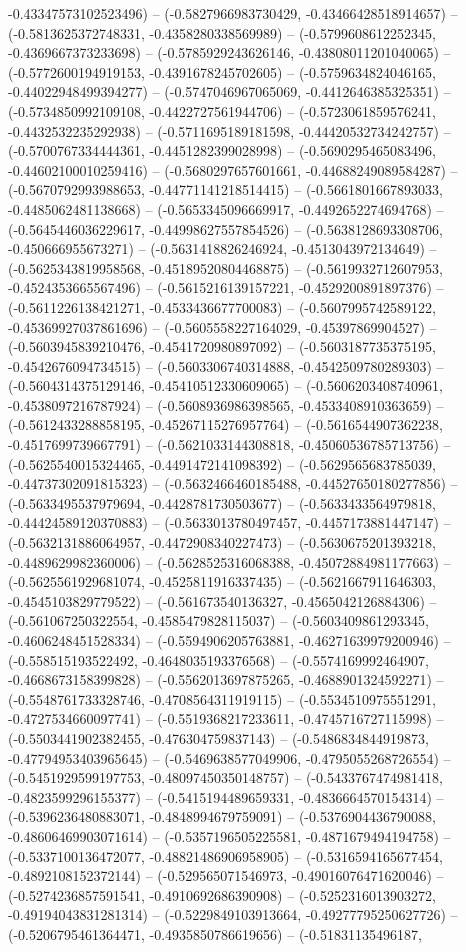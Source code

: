 -0.43347573102523496) -- (-0.5827966983730429, -0.43466428518914657) -- (-0.5813625372748331, -0.4358280338569989) -- (-0.5799608612252345, -0.4369667373233698) -- (-0.5785929243626146, -0.43808011201040065) -- (-0.5772600194919153, -0.4391678245702605) -- (-0.5759634824046165, -0.44022948499394277) -- (-0.5747046967065069, -0.4412646385325351) -- (-0.5734850992109108, -0.4422727561944706) -- (-0.5723061859576241, -0.4432532235292938) -- (-0.5711695189181598, -0.44420532734242757) -- (-0.5700767334444361, -0.4451282399028998) -- (-0.5690295465083496, -0.44602100010259416) -- (-0.5680297657601661, -0.44688249089584287) -- (-0.5670792993988653, -0.44771141218514415) -- (-0.5661801667893033, -0.4485062481138668) -- (-0.5653345096669917, -0.4492652274694768) -- (-0.5645446036229617, -0.44998627557854526) -- (-0.5638128693308706, -0.450666955673271) -- (-0.5631418826246924, -0.4513043972134649) -- (-0.5625343819958568, -0.45189520804468875) -- (-0.5619932712607953, -0.4524353665567496) -- (-0.5615216139157221, -0.4529200891897376) -- (-0.5611226138421271, -0.4533436677700083) -- (-0.5607995742589122, -0.45369927037861696) -- (-0.5605558227164029, -0.45397869904527) -- (-0.5603945839210476, -0.4541720980897092) -- (-0.5603187735375195, -0.4542676094734515) -- (-0.5603306740314888, -0.4542509780289303) -- (-0.5604314375129146, -0.45410512330609065) -- (-0.5606203408740961, -0.4538097216787924) -- (-0.5608936986398565, -0.4533408910363659) -- (-0.5612433288858195, -0.45267115276957764) -- (-0.5616544907362238, -0.4517699739667791) -- (-0.5621033144308818, -0.45060536785713756) -- (-0.5625540015324465, -0.4491472141098392) -- (-0.5629565683785039, -0.44737302091815323) -- (-0.5632466460185488, -0.44527650180277856) -- (-0.5633495537979694, -0.4428781730503677) -- (-0.5633433564979818, -0.44424589120370883) -- (-0.5633013780497457, -0.4457173881447147) -- (-0.5632131886064957, -0.4472908340227473) -- (-0.5630675201393218, -0.4489629982360006) -- (-0.5628525316068388, -0.45072884981177663) -- (-0.5625561929681074, -0.4525811916337435) -- (-0.5621667911646303, -0.4545103829779522) -- (-0.561673540136327, -0.4565042126884306) -- (-0.561067250322554, -0.4585479828115037) -- (-0.5603409861293345, -0.4606248451528334) -- (-0.5594906205763881, -0.46271639979200946) -- (-0.558515193522492, -0.4648035193376568) -- (-0.5574169992464907, -0.4668673158399828) -- (-0.5562013697875265, -0.4688901324592271) -- (-0.5548761733328746, -0.4708564311919115) -- (-0.5534510975551291, -0.4727534660097741) -- (-0.5519368217233611, -0.4745716727115998) -- (-0.5503441902382455, -0.476304759837143) -- (-0.5486834844919873, -0.47794953403965645) -- (-0.5469638577049906, -0.4795055268726554) -- (-0.5451929599197753, -0.48097450350148757) -- (-0.5433767474981418, -0.4823599296155377) -- (-0.5415194489659331, -0.4836664570154314) -- (-0.5396236480883071, -0.4848994679759091) -- (-0.5376904436790088, -0.48606469903071614) -- (-0.5357196505225581, -0.4871679494194758) -- (-0.5337100136472077, -0.48821486906958905) -- (-0.5316594165677454, -0.4892108152372144) -- (-0.529565071546973, -0.49016076471620046) -- (-0.5274236857591541, -0.4910692686390908) -- (-0.5252316013903272, -0.49194043831281314) -- (-0.5229849103913664, -0.49277795250627726) -- (-0.5206795461364471, -0.4935850786619656) -- (-0.51831135496187, 